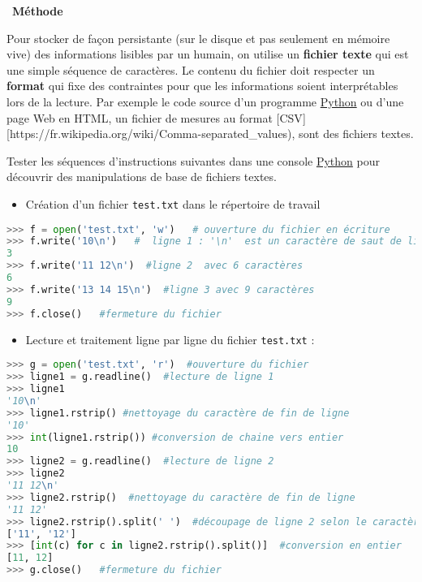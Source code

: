 \documentclass[
  11pt,
]{article}
\newcommand{\passthrough}[1]{#1}
\providecommand{\tightlist}{%
  \setlength{\itemsep}{0pt}\setlength{\parskip}{0pt}}
\newcounter{prog}
\newenvironment{methode}[1]
{\par \medskip    \noindent  
 \begin {bclogo}[arrondi =0.1,logo=\bcoutil, marge=4,noborder = true] {~\textbf{Méthode}   {\itshape #1} }  \par}
{
\end{bclogo}
 \par \bigskip }
\begin{document}
\begin{methode}{}

Pour stocker de façon persistante (sur le disque et pas seulement en
mémoire vive) des informations lisibles par un humain, on utilise un
\textbf{fichier texte} qui est une simple séquence de caractères. Le
contenu du fichier doit respecter un \textbf{format} qui fixe des
contraintes pour que les informations soient interprétables lors de la
lecture. Par exemple le code source d'un programme
\href{https://docs.python.org/3/tutorial/datastructures.html}{Python} ou
d'une page Web en HTML, un fichier de mesures au format
{[}CSV{]}{[}https://fr.wikipedia.org/wiki/Comma-separated\_values), sont
des fichiers textes.

Tester les séquences d'instructions suivantes dans une console
\href{https://docs.python.org/3/tutorial/datastructures.html}{Python}
pour découvrir des manipulations de base de fichiers textes.

\begin{itemize}
\tightlist
\item
  Création d'un fichier \passthrough{\lstinline!test.txt!} dans le
  répertoire de travail
\end{itemize}

\begin{lstlisting}[language=Python]
>>> f = open('test.txt', 'w')   # ouverture du fichier en écriture
>>> f.write('10\n')   #  ligne 1 : '\n'  est un caractère de saut de ligne
3
>>> f.write('11 12\n')  #ligne 2  avec 6 caractères 
6
>>> f.write('13 14 15\n')  #ligne 3 avec 9 caractères
9
>>> f.close()   #fermeture du fichier
\end{lstlisting}

\begin{itemize}
\tightlist
\item
  Lecture et traitement ligne par ligne du fichier
  \passthrough{\lstinline!test.txt!} :
\end{itemize}

\begin{lstlisting}[language=Python]
>>> g = open('test.txt', 'r')  #ouverture du fichier
>>> ligne1 = g.readline()  #lecture de ligne 1
>>> ligne1
'10\n'
>>> ligne1.rstrip() #nettoyage du caractère de fin de ligne
'10'
>>> int(ligne1.rstrip()) #conversion de chaine vers entier
10
>>> ligne2 = g.readline()  #lecture de ligne 2
>>> ligne2
'11 12\n'
>>> ligne2.rstrip()  #nettoyage du caractère de fin de ligne
'11 12'
>>> ligne2.rstrip().split(' ')  #découpage de ligne 2 selon le caractère par défaut de séparation ' ', on peut écrire juste split() 
['11', '12']
>>> [int(c) for c in ligne2.rstrip().split()]  #conversion en entier
[11, 12]
>>> g.close()   #fermeture du fichier
\end{lstlisting}

\end{methode}
\end{document}
